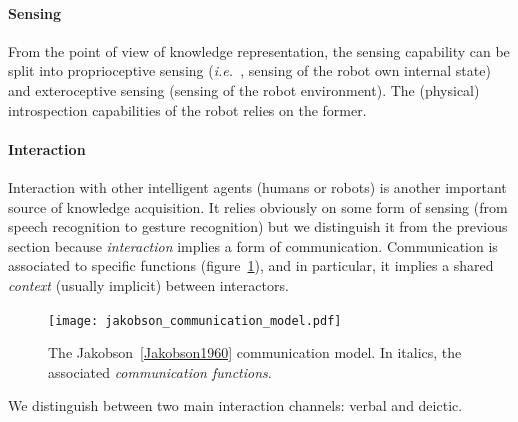 \documentclass[a4paper, twocolumn]{article}
\newcommand{\ie}{{\textit{i.e.\ }}}
\begin{document}
\paragraph{Sensing}

From the point of view of knowledge representation, the sensing capability can
be split into proprioceptive sensing (\ie, sensing of the robot own internal
state) and exteroceptive sensing (sensing of the robot environment). The
(physical) introspection capabilities of the robot relies on the former.


\paragraph{Interaction}

Interaction with other intelligent agents (humans or robots) is another
important source of knowledge acquisition. It relies obviously on some form of
sensing (from speech recognition to gesture recognition) but we distinguish it
from the previous section because \emph{interaction} implies a form of
communication. Communication is associated to specific functions
(figure~\ref{fig|communication-model}), and in particular, it implies a shared
\emph{context} (usually implicit) between interactors.

\begin{figure}
    \centering
    \texttt{[image: jakobson\_communication\_model.pdf]}

    \caption{The Jakobson~\ref{Jakobson1960} communication model. In italics,
    the associated \emph{communication functions}.}

    \label{fig|communication-model}
\end{figure}

We distinguish between two main interaction channels: verbal and deictic.

\begin{scriptsize}
\begin{center}
\end{center}
\end{scriptsize}

\label{sect|nlp}
\end{document}
